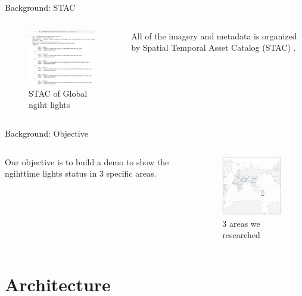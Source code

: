 \documentclass[aspectratio=169]{beamer}
\begin{document}
\begin{frame}[fragile]{Background: STAC}

  \begin{columns}
    
    \begin{figure}[htbp]
      \centerline{\includegraphics[width=160pt]{images/STAC.png}}
      \caption{STAC of Global ngiht lights}
      \label{STAC}
    \end{figure}

    All of the imagery and metadata is organized by Spatial Temporal Asset Catalog (STAC) \citep{SpatioTe90:online}. 
  \end{columns}
\end{frame}

\begin{frame}[fragile]{Background: Objective}

  \begin{columns}
    Our objective is to build a demo to show the ngihttime lights status in 3 specific areas.
      \begin{figure}[htbp]
        \centerline{\includegraphics[width=130pt]{images/Worldmap.png}}
        \caption{3 areas we researched}
        \label{areas}
      \end{figure}
  \end{columns}
\end{frame}

\section{Architecture}
\end{document}

